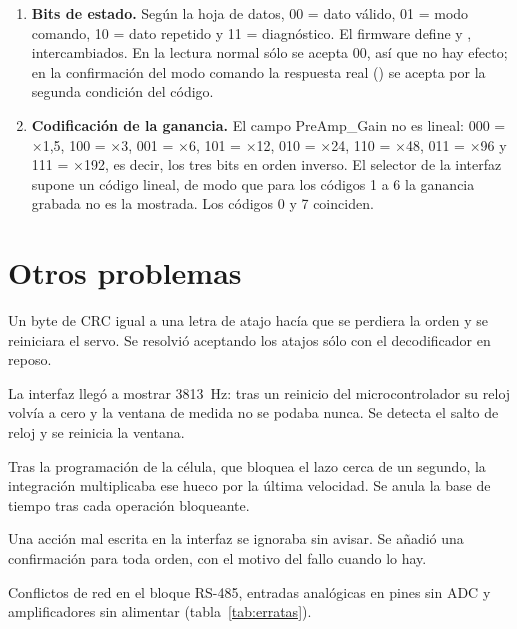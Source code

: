 \begin{enumerate}
  \item \textbf{Bits de estado.} Según la hoja de datos, 00 = dato válido, 01 = modo comando,
        10 = dato repetido y 11 = diagnóstico. El firmware define  y
        , intercambiados. En la lectura normal sólo se acepta 00, así
        que no hay efecto; en la confirmación del modo comando la respuesta real () se
        acepta por la segunda condición del código.
  \item \textbf{Codificación de la ganancia.} El campo PreAmp\_Gain no es lineal: 000 = ×1,5,
        100 = ×3, 001 = ×6, 101 = ×12, 010 = ×24, 110 = ×48, 011 = ×96 y 111 = ×192, es decir, los
        tres bits en orden inverso. El selector de la interfaz supone un código lineal, de modo que
        para los códigos 1 a 6 la ganancia grabada no es la mostrada. Los códigos 0 y 7 coinciden.
\end{enumerate}

\section{Otros problemas}

\begin{description}[style=nextline,leftmargin=1.5em]
  \item[Órdenes perdidas por los atajos de teclado] Un byte de CRC igual a una letra de atajo hacía
        que se perdiera la orden y se reiniciara el servo. Se resolvió aceptando los atajos sólo con
        el decodificador en reposo.
  \item[Frecuencia de muestreo imposible] La interfaz llegó a mostrar \SI{3813}{\hertz}: tras un
        reinicio del microcontrolador su reloj volvía a cero y la ventana de medida no se podaba
        nunca. Se detecta el salto de reloj y se reinicia la ventana.
  \item[Desplazamientos fantasma] Tras la programación de la célula, que bloquea el lazo cerca de un
        segundo, la integración multiplicaba ese hueco por la última velocidad. Se anula la base de
        tiempo tras cada operación bloqueante.
  \item[Órdenes que ``no hacían nada''] Una acción mal escrita en la interfaz se ignoraba sin avisar.
        Se añadió una confirmación para toda orden, con el motivo del fallo cuando lo hay.
  \item[Revisión A de la placa] Conflictos de red en el bloque RS-485, entradas analógicas en pines
        sin ADC y amplificadores sin alimentar (tabla~\ref{tab:erratas}).
\end{description}

